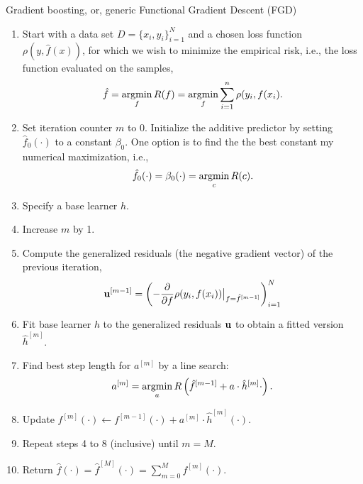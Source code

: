 \begin{algorithm}
\caption{Gradient boosting, or, generic Functional Gradient Descent (FGD)}
\label{algo:fgd}
\begin{enumerate}
    \item Start with a data set $D=\{x_i, y_i\}_{i=1}^N$ and a chosen loss function $\rho(y,\hat{f}(x))$, for which we wish to
        minimize the empirical risk, i.e., the loss function evaluated on the samples,
        \begin{equation}
            \hat{f}=\operatorname*{argmin}_{f}R(f)=\operatorname*{argmin}_{f}\sum_{i=1}^n\rho(y_{i},f(x_{i}).
        \end{equation}
    \item Set iteration counter $m$ to 0. Initialize the additive predictor by setting $\hat{f}_0(\cdot)$ to a constant $\beta_0$. One option is to find the the best constant my numerical maximization, i.e.,
        \begin{equation}
            \hat{f}_0(\cdot)=\beta_0(\cdot)=\operatorname*{argmin}_c R(c).
        \end{equation}
    \item Specify a base learner $h$.
    \item Increase $m$ by 1.
    \item Compute the generalized residuals (the negative gradient vector) of the previous iteration,
        \begin{equation}
            \mathbf{u}^{[m-1]}=\left(-\frac{\partial}{\partial f}\rho(y_i, f(x_i))\big\rvert_{f=\hat{f}^{[m-1]}}\right)_{i=1}^N
        \end{equation}
    \item Fit base learner $h$ to the generalized residuals $\mathbf{u}$ to obtain a fitted version $\hat{h}^{[m]}$.
    \item Find best step length for $a^{[m]}$ by a line search:
        \begin{equation*}
            a^{[m]}=\operatorname*{argmin}_{a}R\left(\hat{f}^{[m-1]}+a\cdot\hat{h}^{[m]}{\cdot}\right).
        \end{equation*}
    \item Update $f^{[m]}(\cdot)\gets f^{[m-1]}(\cdot)+a^{[m]}\cdot \hat{h}^{[m]}(\cdot)$.
    \item Repeat steps 4 to 8 (inclusive) until $m=M$.
    \item Return $\hat{f}(\cdot)=\hat{f}^{[M]}(\cdot)=\sum_{m=0}^{M}f^{[m]}(\cdot)$.
\end{enumerate}
\end{algorithm}

